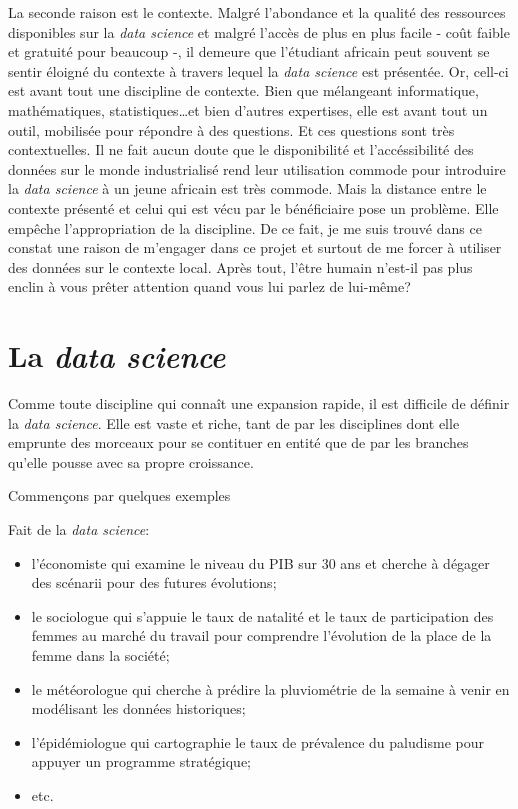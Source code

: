 \documentclass[]{book}
\begin{document}
La seconde raison est le contexte. Malgré l'abondance et la qualité des
ressources disponibles sur la \emph{data science} et malgré l'accès de
plus en plus facile - coût faible et gratuité pour beaucoup -, il
demeure que l'étudiant africain peut souvent se sentir éloigné du
contexte à travers lequel la \emph{data science} est présentée. Or,
cell-ci est avant tout une discipline de contexte. Bien que mélangeant
informatique, mathématiques, statistiques\ldots{}et bien d'autres
expertises, elle est avant tout un outil, mobilisée pour répondre à des
questions. Et ces questions sont très contextuelles. Il ne fait aucun
doute que le disponibilité et l'accéssibilité des données sur le monde
industrialisé rend leur utilisation commode pour introduire la
\emph{data science} à un jeune africain est très commode. Mais la
distance entre le contexte présenté et celui qui est vécu par le
bénéficiaire pose un problème. Elle empêche l'appropriation de la
discipline. De ce fait, je me suis trouvé dans ce constat une raison de
m'engager dans ce projet et surtout de me forcer à utiliser des données
sur le contexte local. Après tout, l'être humain n'est-il pas plus
enclin à vous prêter attention quand vous lui parlez de lui-même?

\section{\texorpdfstring{La \emph{data
science}}{La data science}}\label{la-data-science}

Comme toute discipline qui connaît une expansion rapide, il est
difficile de définir la \emph{data science}. Elle est vaste et riche,
tant de par les disciplines dont elle emprunte des morceaux pour se
contituer en entité que de par les branches qu'elle pousse avec sa
propre croissance.

Commençons par quelques exemples

Fait de la \emph{data science}:

\begin{itemize}
\item
  l'économiste qui examine le niveau du PIB sur 30 ans et cherche à
  dégager des scénarii pour des futures évolutions;
\item
  le sociologue qui s'appuie le taux de natalité et le taux de
  participation des femmes au marché du travail pour comprendre
  l'évolution de la place de la femme dans la société;
\item
  le météorologue qui cherche à prédire la pluviométrie de la semaine à
  venir en modélisant les données historiques;
\item
  l'épidémiologue qui cartographie le taux de prévalence du paludisme
  pour appuyer un programme stratégique;
\item
  etc.
\end{itemize}
\end{document}
